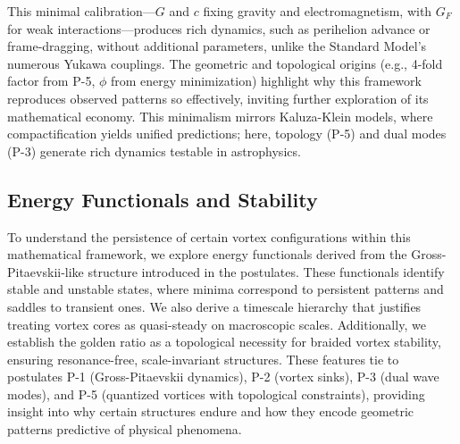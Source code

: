 This minimal calibration---$G$ and $c$ fixing gravity and electromagnetism, with $G_F$ for weak interactions---produces rich dynamics, such as perihelion advance or frame-dragging, without additional parameters, unlike the Standard Model’s numerous Yukawa couplings. The geometric and topological origins (e.g., 4-fold factor from P-5, $\phi$ from energy minimization) highlight why this framework reproduces observed patterns so effectively, inviting further exploration of its mathematical economy. This minimalism mirrors Kaluza-Klein models, where compactification yields unified predictions; here, topology (P-5) and dual modes (P-3) generate rich dynamics testable in astrophysics.


\subsection{Energy Functionals and Stability}

To understand the persistence of certain vortex configurations within this mathematical framework, we explore energy functionals derived from the Gross-Pitaevskii-like structure introduced in the postulates. These functionals identify stable and unstable states, where minima correspond to persistent patterns and saddles to transient ones. We also derive a timescale hierarchy that justifies treating vortex cores as quasi-steady on macroscopic scales. Additionally, we establish the golden ratio as a topological necessity for braided vortex stability, ensuring resonance-free, scale-invariant structures. These features tie to postulates P-1 (Gross-Pitaevskii dynamics), P-2 (vortex sinks), P-3 (dual wave modes), and P-5 (quantized vortices with topological constraints), providing insight into why certain structures endure and how they encode geometric patterns predictive of physical phenomena.


